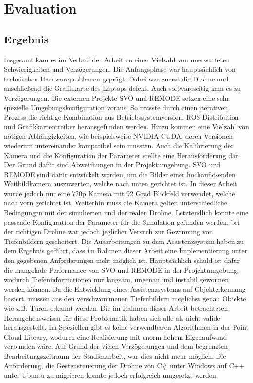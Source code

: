 \chapter{Evaluation}
\section{Ergebnis}
Insgesamt kam es im Verlauf der Arbeit zu einer Vielzahl von unerwarteten Schwierigkeiten und Verzögerungen. Die Anfangsphase war hauptsächlich von technischen Hardwareproblemen geprägt. Dabei war zuerst die Drohne und anschließend die Grafikkarte des Laptops defekt. \newline
Auch softwareseitig kam es zu Verzögerungen. Die externen Projekte SVO und REMODE setzen eine sehr spezielle Umgebungskonfiguration voraus. So musste durch einen iterativen Prozess die richtige Kombination aus Betriebssystemversion, ROS Distribution und Grafikkartentreiber herausgefunden werden. Hinzu kommen eine Vielzahl von nötigen Abhängigkeiten, wie beispielsweise NVIDIA CUDA, deren Versionen wiederum untereinander kompatibel sein mussten.  \newline
Auch die Kalibrierung der Kamera und die Konfiguration der Parameter stellte eine Herausforderung dar. Der Grund dafür sind Abweichungen in der Projektumgebung. SVO und REMODE sind dafür entwickelt worden, um die Bilder einer hochauflösenden Weitbildkamera auszuwerten, welche nach unten gerichtet ist. In dieser Arbeit wurde jedoch nur eine 720p Kamera mit 92 Grad Blickfeld verwendet, welche nach vorn gerichtet ist. Weiterhin muss die Kamera gelten unterschiedliche Bedingungen mit der simulierten und der realen Drohne. \newline
Letztendlich konnte eine passende Konfiguration der Parameter für die Simulation gefunden werden, bei der richtigen Drohne war jedoch jeglicher Versuch zur Gewinnung von Tiefenbildern gescheitert. \newline
Die Ausarbeitungen zu dem Assistenzsystem haben zu dem Ergebnis geführt, dass im Rahmen dieser Arbeit eine Implementierung unter den gegebenen Anforderungen nicht möglich ist. Hauptsächlich schuld ist dafür die mangelnde Performance von SVO und REMODE in der Projektumgebung, wodurch Tiefeninformationen nur langsam, ungenau und instabil gewonnen werden können. Da die Entwicklung eines Assistenzsystems auf Objekterkennung basiert, müssen aus den verschwommenen Tiefenbildern möglichst genau Objekte wie z.B. Türen erkannt werden. Die im Rahmen dieser Arbeit betrachteten Herangehensweisen für diese Problematik haben sich alle als nicht valide herausgestellt. Im Speziellen gibt es keine verwendbaren Algorithmen in der Point Cloud Library, wodurch eine Realisierung mit enorm hohem Eigenaufwand verbunden wäre. Auf Grund der vielen Verzögerungen und dem begrenzten Bearbeitungszeitraum der Studienarbeit, war dies nicht mehr möglich.
Die Anforderung, die Gestensteuerung der Drohne von C\# unter Windows auf C++ unter Ubuntu zu migrieren konnte jedoch erfolgreich umgesetzt werden.

